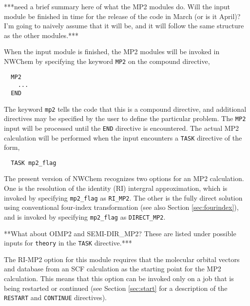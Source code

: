 \label{sec:mp2}
\Large
***need a brief summary here of what the MP2 modules do. Will the input
module be finished in time for the release of the code in March (or is
it April)?  I'm going to naively assume that it will be, and it will follow
the same structure as the other modules.***
\normalsize


When the input module is finished, the MP2 modules will be invoked in NWChem 
by specifying the keyword \verb+MP2+ on the compound directive,

\begin{verbatim}
  MP2
    ...
  END
\end{verbatim}

The keyword \verb+mp2+ tells the code that this is a compound directive,
and additional directives may be specified by the user to define the particular
problem.  The \verb+MP2+ input will be processed until the
\verb+END+ directive is encountered.  The actual MP2 calculation will
be performed when the input encounters a \verb+TASK+ directive of the form,

\begin{verbatim}
  TASK mp2_flag
\end{verbatim}

The present version of NWChem recognizes two options for an MP2 calculation.
One is the
resolution of the identity (RI) intergral approximation, which is invoked
by specifying \verb+mp2_flag+ as \verb+RI_MP2+.  The other is the fully direct
solution using conventional four-index transformation (see also Section 
\ref{sec:fourindex}), and is invoked by
specifying \verb+mp2_flag+ as \verb+DIRECT_MP2+.

\Large
**What about OIMP2 and SEMI-DIR\_MP2?  These are listed under possible
inputs for \verb+theory+ in the \verb+TASK+ directive.***
\normalsize




The RI-MP2 option for this module requires that the molecular orbital
vectors and database from an SCF calculation as the starting point for
the MP2 calculation.  This means that this option can be invoked only
on a job that is being restarted or continued (see Section \ref{sec:start}
for a description of the \verb+RESTART+ and \verb+CONTINUE+ directives).

